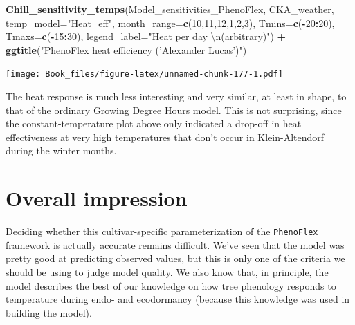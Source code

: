 \documentclass[
]{book}
\newenvironment{Shaded}{\begin{snugshade}}{\end{snugshade}}
\newcommand{\CharTok}[1]{\textcolor[rgb]{0.31,0.60,0.02}{#1}}
\newcommand{\DataTypeTok}[1]{\textcolor[rgb]{0.13,0.29,0.53}{#1}}
\newcommand{\DecValTok}[1]{\textcolor[rgb]{0.00,0.00,0.81}{#1}}
\newcommand{\KeywordTok}[1]{\textcolor[rgb]{0.13,0.29,0.53}{\textbf{#1}}}
\newcommand{\NormalTok}[1]{#1}
\newcommand{\OperatorTok}[1]{\textcolor[rgb]{0.81,0.36,0.00}{\textbf{#1}}}
\newcommand{\StringTok}[1]{\textcolor[rgb]{0.31,0.60,0.02}{#1}}
\begin{document}
\begin{Shaded}
\begin{Highlighting}[]
\KeywordTok{Chill_sensitivity_temps}\NormalTok{(Model_sensitivities_PhenoFlex,}
\NormalTok{                        CKA_weather,}
                        \DataTypeTok{temp_model=}\StringTok{"Heat_eff"}\NormalTok{,}
                        \DataTypeTok{month_range=}\KeywordTok{c}\NormalTok{(}\DecValTok{10}\NormalTok{,}\DecValTok{11}\NormalTok{,}\DecValTok{12}\NormalTok{,}\DecValTok{1}\NormalTok{,}\DecValTok{2}\NormalTok{,}\DecValTok{3}\NormalTok{),}
                        \DataTypeTok{Tmins=}\KeywordTok{c}\NormalTok{(}\OperatorTok{-}\DecValTok{20}\OperatorTok{:}\DecValTok{20}\NormalTok{),}
                        \DataTypeTok{Tmaxs=}\KeywordTok{c}\NormalTok{(}\OperatorTok{-}\DecValTok{15}\OperatorTok{:}\DecValTok{30}\NormalTok{),}
                        \DataTypeTok{legend_label=}\StringTok{"Heat per day }\CharTok{\textbackslash{}n}\StringTok{(arbitrary)"}\NormalTok{) }\OperatorTok{+}
\StringTok{  }\KeywordTok{ggtitle}\NormalTok{(}\StringTok{"PhenoFlex heat efficiency ('Alexander Lucas')"}\NormalTok{)}
\end{Highlighting}
\end{Shaded}

\texttt{[image: Book\_files/figure-latex/unnamed-chunk-177-1.pdf]}

The heat response is much less interesting and very similar, at least in shape, to that of the ordinary Growing Degree Hours model. This is not surprising, since the constant-temperature plot above only indicated a drop-off in heat effectiveness at very high temperatures that don't occur in Klein-Altendorf during the winter months.

\hypertarget{overall-impression}{%
\section{Overall impression}\label{overall-impression}}

Deciding whether this cultivar-specific parameterization of the \texttt{PhenoFlex} framework is actually accurate remains difficult. We've seen that the model was pretty good at predicting observed values, but this is only one of the criteria we should be using to judge model quality. We also know that, in principle, the model describes the best of our knowledge on how tree phenology responds to temperature during endo- and ecodormancy (because this knowledge was used in building the model).
\end{document}
